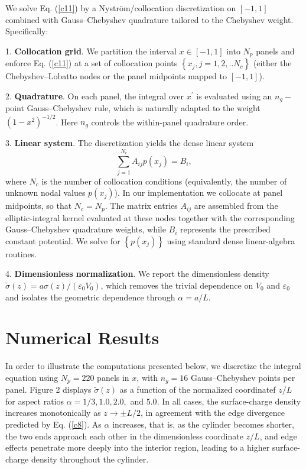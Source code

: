 \documentclass[12pt]{article}
\begin{document}
We solve Eq. (\ref{c11}) by a Nystr\"{o}m/collocation discretization on
$\left[  -1,1\right]  $ combined with Gauss--Chebyshev quadrature tailored to
the Chebyshev weight. Specifically:

1. \textbf{Collocation grid}. We partition the interval $x\in\left[
-1,1\right]  $ into $N_{p}$ panels and enforce Eq. (\ref{c11}) at a set of
collocation points $\left\{  x_{j},j=1,2,..N_{c}\right\}  $ (either the
Chebyshev--Lobatto nodes or the panel midpoints mapped to $\left[
-1,1\right]  $).

2. \textbf{Quadrature}. On each panel, the integral over $x^{\prime}$ is
evaluated using an $n_{g}-$point Gauss--Chebyshev rule, which is naturally
adapted to the weight $\left(  1-x^{2}\right)  ^{-1/2}$. Here $n_{g}$ controls
the within-panel quadrature order.

3. \textbf{Linear system}. The discretization yields the dense linear system%
\begin{equation}
\sum\limits_{j=1}^{N_{c}}A_{ij}p(x_{j})=B_{i}, \label{c11a}%
\end{equation}
where $N_{c}$ is the number of collocation conditions (equivalently, the
number of unknown nodal values $p(x_{j})$). In our implementation we collocate
at panel midpoints, so that $N_{c}=N_{p}$. The matrix entries $A_{ij}$ are
assembled from the elliptic-integral kernel evaluated at these nodes together
with the corresponding Gauss--Chebyshev quadrature weights, while $B_{i}$
represents the prescribed constant potential. We solve for $\left\{
p(x_{j})\right\}  $ using standard dense linear-algebra routines.

4. \textbf{Dimensionless normalization}. We report the dimensionless density
$\widetilde{\sigma}(z)=a\sigma(z)/(\varepsilon_{0}V_{0})$, which removes the
trivial dependence on $V_{0}$ and $\varepsilon_{0}$ and isolates the geometric
dependence through $\alpha=a/L$.

\section{Numerical Results}

In order to illustrate the computations presented below, we discretize the
integral equation using $N_{p}=220$ panels in $x$, with $n_{g}=16$
Gauss--Chebyshev points per panel. Figure 2 displays $\widetilde{\sigma}(z)$
as a function of the normalized coordinatef $z/L$ for aspect ratios
$\alpha=1/3,1.0,2.0,$ and $5.0$. In all cases, the surface-charge density
increases monotonically as $z\rightarrow\pm L/2$, in agreement with the edge
divergence predicted by Eq. (\ref{c8}). As $\alpha$ increases, that is, as the
cylinder becomes shorter, the two ends approach each other in the
dimensionless coordinate $z/L$, and edge effects penetrate more deeply into
the interior region, leading to a higher surface-charge density throughout the cylinder.
\end{document}
